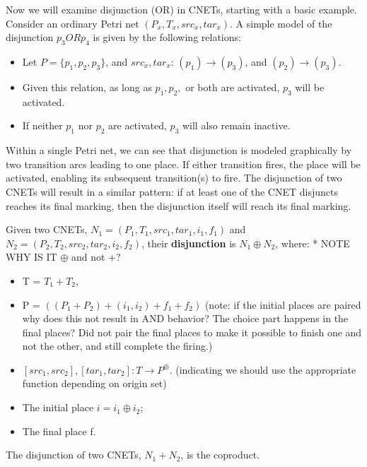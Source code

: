 \begin{example}
  \label{ex:OR-PN}
Now we will examine disjunction (OR) in CNETs, starting with a basic example. Consider an ordinary Petri net $(P_x, T_x, src_x, tar_x)$. A simple model of the disjunction $p_3 OR p_4$ is given by the following relations:
  \begin{itemize}
  \item Let $P = \{p_1, p_2, p_3\}$, and $src_x, tar_x$: $(p_1) \to (p_3)$, and $(p_2) \to (p_3)$. 
  \item Given this relation, as long as $p_1, p_2,$ or both are activated, $p_3$ will be activated. 
  \item If neither $p_1$ nor $p_2$ are activated, $p_3$ will also remain inactive.  
  \end{itemize}
Within a single Petri net, we can see that disjunction is modeled graphically by two transition arcs leading to one place. If either transition fires, the place will be activated, enabling its subsequent transition(s) to fire. The disjunction of two CNETs will result in a similar pattern: if at least one of the CNET disjuncts reaches its final marking, then the disjunction itself will reach its final marking.   
\end{example}
\begin{definition}
  \label{def:OR-PN}
  Given two CNETs, $N_1= (P_1, T_1, src_1, tar_1, i_1, f_1)$ and $N_2= (P_2, T_2, src_2, tar_2, i_2, f_2)$, their \textbf{disjunction} is $N_1 \oplus N_2$, where: * NOTE WHY IS IT $\oplus$ and not +?
\begin{itemize}
\item T = $T_1 + T_2$,
\item P = $((P_1 + P_2) + (i_1 , i_2) + f_1 + f_2)$ (note: if the initial places are paired why does this not result in AND behavior? The choice part happens in the final places? Did not pair the final places to make it possible to finish one and not the other, and still complete the firing.)
\item $[src_1, src_2], [tar_1, tar_2]: T\to P^\oplus$. (indicating we should use the appropriate function depending on origin set)
\item The initial place $i = i_1 \oplus i_2$;
\item The final place f.
\end{itemize}
\end{definition}
\begin{lemma}
  \label{lemma:OR-coproduct}
  The disjunction of two CNETs, $N_1 + N_2$, is the coproduct. 
\end{lemma}

